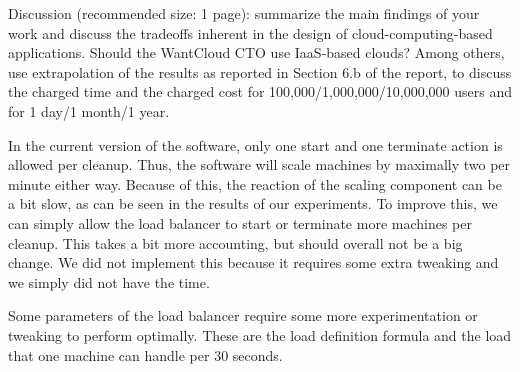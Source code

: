 Discussion (recommended size: 1 page): summarize the main findings of your work and discuss the tradeoffs inherent in the design of cloud-computing-based applications.
Should the WantCloud CTO use IaaS-based clouds?
Among others, use extrapolation of the results as reported in Section 6.b of the report, to discuss the charged time and the charged cost for 100,000/1,000,000/10,000,000 users and for 1 day/1 month/1 year.

In the current version of the software, only one start and one terminate action is allowed per cleanup.
Thus, the software will scale machines by maximally two per minute either way.
Because of this, the reaction of the scaling component can be a bit slow, as can be seen in the results of our experiments.
To improve this, we can simply allow the load balancer to start or terminate more machines per cleanup.
This takes a bit more accounting, but should overall not be a big change.
We did not implement this because it requires some extra tweaking and we simply did not have the time.

Some parameters of the load balancer require some more experimentation or tweaking to perform optimally.
These are the load definition formula and the load that one machine can handle per 30 seconds.
